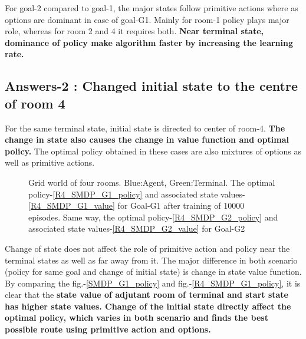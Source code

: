\documentclass[preprint,12pt]{elsarticle}
\begin{document}
 For goal-2 compared to goal-1, the major states follow primitive actions where as options are dominant in case of goal-G1. Mainly for room-1 policy plays major role, whereas for room 2 and 4 it requires both.  \textbf{Near terminal state, dominance of policy make algorithm faster by increasing the learning rate.}


\subsection{Answers-2 : Changed initial state to the centre of room 4}

For the same terminal state, initial state is directed to center of room-4. \textbf{The change in state also causes the change in value function and optimal policy.} The optimal policy obtained in these cases are also mixtures of options as well as primitive actions. 

\begin{figure}[H]
	\centering  
	\caption{Grid world of four rooms.  Blue:Agent, Green:Terminal. The optimal policy-\ref{R4_SMDP_G1_policy} and associated state values-\ref{R4_SMDP_G1_value} for Goal-G1 after training of 10000 episodes. Same way, the optimal policy-\ref{R4_SMDP_G2_policy} and associated state values-\ref{R4_SMDP_G2_value} for Goal-G2}
	\label{fig:R4_SMDP}
\end{figure}

Change of state does not affect the role of primitive action and policy near the terminal states as well as far away from it. The major difference in both scenario (policy for same goal and change of initial state) is change in state value function. By comparing the fig.-\ref{SMDP_G1_policy} and fig.-\ref{R4_SMDP_G1_policy}, it is clear that the \textbf{state value of adjutant room of terminal and start state has higher state values. Change of the initial state directly affect the optimal policy, which varies in both scenario and finds the best possible route using primitive action and options.}
\end{document}
